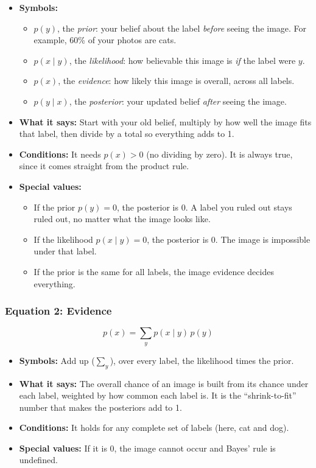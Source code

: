 \begin{itemize}
  \item \textbf{Symbols:}
  \begin{itemize}
    \item $p(y)$, the \textit{prior}: your belief about the label \textit{before} seeing the image. For example, 60\% of your photos are cats.
    \item $p(x \mid y)$, the \textit{likelihood}: how believable this image is \textit{if} the label were $y$.
    \item $p(x)$, the \textit{evidence}: how likely this image is overall, across all labels.
    \item $p(y \mid x)$, the \textit{posterior}: your updated belief \textit{after} seeing the image.
  \end{itemize}
  \item \textbf{What it says:} Start with your old belief, multiply by how well the image fits that label, then divide by a total so everything adds to 1.
  \item \textbf{Conditions:} It needs $p(x) > 0$ (no dividing by zero). It is always true, since it comes straight from the product rule.
  \item \textbf{Special values:}
  \begin{itemize}
    \item If the prior $p(y) = 0$, the posterior is 0. A label you ruled out stays ruled out, no matter what the image looks like.
    \item If the likelihood $p(x \mid y) = 0$, the posterior is 0. The image is impossible under that label.
    \item If the prior is the same for all labels, the image evidence decides everything.
  \end{itemize}
\end{itemize}

\subsubsection*{Equation 2: Evidence}

\[
p(x) = \sum_y p(x \mid y)\, p(y)
\]

\begin{itemize}
  \item \textbf{Symbols:} Add up ($\sum_y$), over every label, the likelihood times the prior.
  \item \textbf{What it says:} The overall chance of an image is built from its chance under each label, weighted by how common each label is. It is the ``shrink-to-fit'' number that makes the posteriors add to 1.
  \item \textbf{Conditions:} It holds for any complete set of labels (here, cat and dog).
  \item \textbf{Special values:} If it is 0, the image cannot occur and Bayes' rule is undefined.
\end{itemize}

